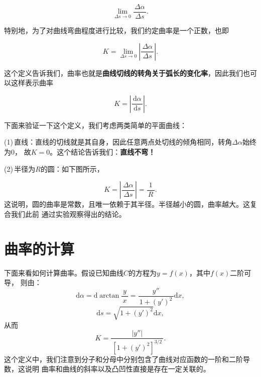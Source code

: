 \documentclass[a4paper]{article}
\newcommand*{\df}[2]{\displaystyle\frac{\,{#1}\,}{\,{#2}\,}}
\renewcommand{\d}{\mathrm{d}}
\begin{document}
$$\lim_{\Delta s\to 0}\df{\Delta\alpha}{\Delta s}.$$

特别地，为了对曲线弯曲程度进行比较，我们约定曲率是一个正数，也即

$$K=\lim_{\Delta s\to 0}\left|\df{\Delta\alpha}{\Delta s}\right|.$$

这个定义告诉我们，曲率也就是{\bf 曲线切线的转角关于弧长的变化率}，因此我们也可以这样表示曲率

$$K=\left|\df{\d\alpha}{\d s}\right|.$$

下面来验证一下这个定义，我们考虑两类简单的平面曲线：

{(1)\,直线：}直线的切线就是其自身，因此任意两点处切线的倾角相同，转角$\Delta\alpha$始终为$0$，
故$K=0$。这个结论告诉我们：{\bf 直线不弯！}

{(2)\,半径为$R$的圆：}如下图所示，
\begin{center}
\end{center}
$$K=\left|\df{\Delta\alpha}{\Delta s}\right|=\df 1R.$$
这说明，圆的曲率是常数，且唯一依赖于其半径。半径越小的圆，曲率越大。这复合我们此前
通过实验观察得出的结论。
\section{曲率的计算}

下面来看如何计算曲率。假设已知曲线$C$的方程为$y=f(x)$，其中$f(x)$二阶可导，
则由：
$$\d\alpha=\d\arctan\df yx=\df{y''}{1+(y')^2}\d x,$$
$$\d s=\sqrt{1+(y')^2}\d x,$$
从而
$$K=\df{|y''|}{[1+(y')^2]^{3/2}}.$$
这个定义中，我们注意到分子和分母中分别包含了曲线对应函数的一阶和二阶导数，这说明
曲率和曲线的斜率以及凸凹性直接是存在一定关联的。
\end{document}

